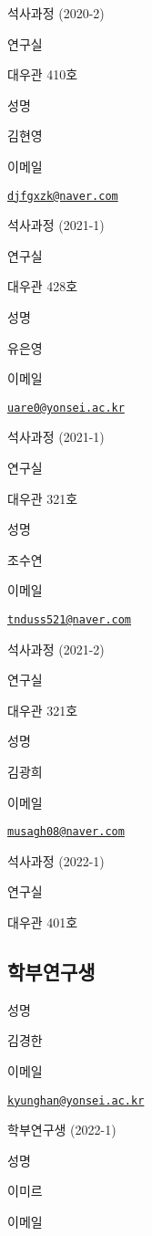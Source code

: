 \documentclass[
]{book}
\begin{document}
석사과정 (2020-2)

연구실

대우관 410호

성명

김현영

이메일

\href{mailto:djfgxzk@naver.com}{\nolinkurl{djfgxzk@naver.com}}

석사과정 (2021-1)

연구실

대우관 428호

성명

유은영

이메일

\href{mailto:uare0@yonsei.ac.kr}{\nolinkurl{uare0@yonsei.ac.kr}}

석사과정 (2021-1)

연구실

대우관 321호

성명

조수연

이메일

\href{mailto:tnduss521@naver.com}{\nolinkurl{tnduss521@naver.com}}

석사과정 (2021-2)

연구실

대우관 321호

성명

김광희

이메일

\href{mailto:musagh08@naver.com}{\nolinkurl{musagh08@naver.com}}

석사과정 (2022-1)

연구실

대우관 401호

\hypertarget{uxd559uxbd80uxc5f0uxad6cuxc0dd}{%
\subsection*{학부연구생}\label{uxd559uxbd80uxc5f0uxad6cuxc0dd}}

성명

김경한

이메일

\href{mailto:kyunghan@yonsei.ac.kr}{\nolinkurl{kyunghan@yonsei.ac.kr}}

학부연구생 (2022-1)

성명

이미르

이메일
\end{document}
